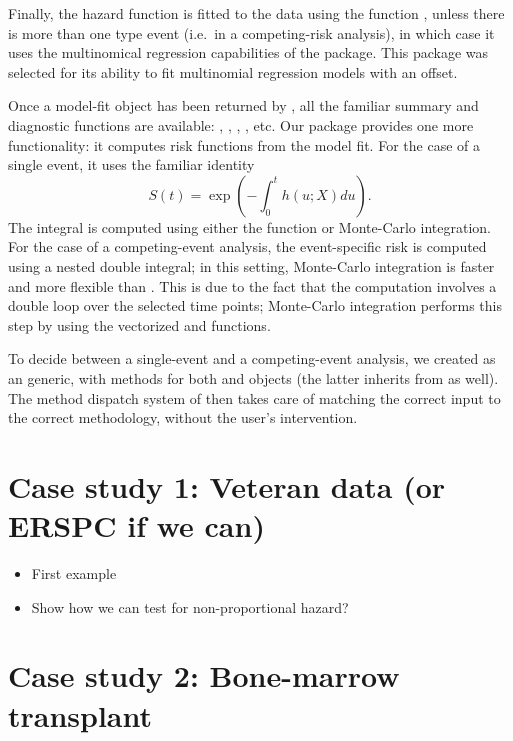 \documentclass[article]{jss}
\providecommand{\tightlist}{%
  \setlength{\itemsep}{0pt}\setlength{\parskip}{0pt}}
\begin{document}
Finally, the hazard function is fitted to the data using the function
, unless there is more than one type event (i.e.~in a
competing-risk analysis), in which case it uses the multinomical
regression capabilities of the  package. This package was
selected for its ability to fit multinomial regression models with an
offset.

Once a model-fit object has been returned by , all
the familiar summary and diagnostic functions are available:
, , , , etc. Our
package provides one more functionality: it computes risk functions from
the model fit. For the case of a single event, it uses the familiar
identity \[S(t) = \exp\left(-\int_0^t h(u;X) du\right).\] The integral
is computed using either the  function or
Monte-Carlo integration. For the case of a competing-event analysis, the
event-specific risk is computed using a nested double integral; in this
setting, Monte-Carlo integration is faster and more flexible than
. This is due to the fact that the computation
involves a double loop over the selected time points; Monte-Carlo
integration performs this step by using the vectorized 
and  functions.

To decide between a single-event and a competing-event analysis, we
created  as an  generic, with methods for
both  and  objects (the latter inherits from
 as well). The method dispatch system of  then
takes care of matching the correct input to the correct methodology,
without the user's intervention.

\section{Case study 1: Veteran data (or ERSPC if we
can)}\label{case-study-1-veteran-data-or-erspc-if-we-can}

\begin{itemize}
\tightlist
\item
  First example
\item
  Show how we can test for non-proportional hazard?
\end{itemize}

\section{Case study 2: Bone-marrow
transplant}\label{case-study-2-bone-marrow-transplant}
\end{document}
